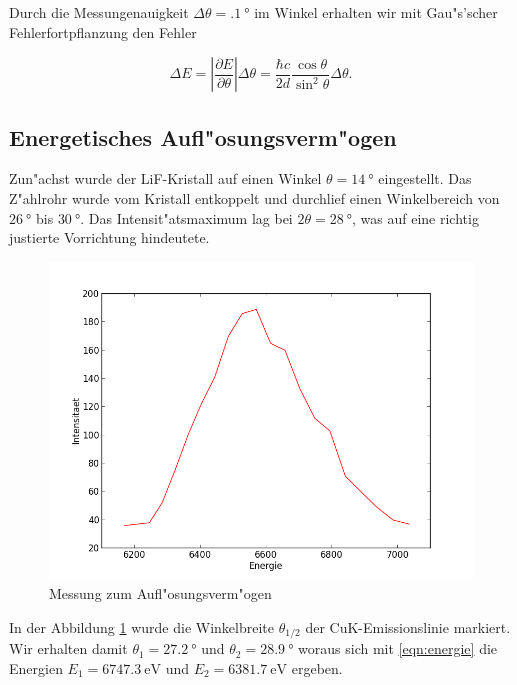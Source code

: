 	Durch die Messungenauigkeit $\Delta \theta = \SI{.1}{\degree}$ im Winkel erhalten wir mit Gau"s'scher Feh\-ler\-fort\-pflanz\-ung den Fehler

	\begin{equation}
		\Delta E = \left| \frac{\partial E}{\partial \theta} \right| \Delta \theta = 
		\frac{\hbar c}{2 d} \frac{\cos{\theta}}{\sin^2{\theta}} \Delta \theta .
	\end{equation}

	\subsection{Energetisches Aufl"osungsverm"ogen}
		\label{subsec:aufloesung}

		Zun"achst wurde der LiF-Kristall auf einen Winkel $\theta = \SI{14}{\degree}$ eingestellt.
		Das Z"ahlrohr wurde vom Kristall entkoppelt und durchlief einen Winkelbereich von $\SI{26}{\degree}$ bis $\SI{30}{\degree}$.
		Das Intensit"atsmaximum lag bei $2\theta = \SI{28}{\degree}$, was auf eine richtig justierte Vorrichtung hin\-deu\-te\-te.

		\begin{figure}[h!]
			\centering
			\includegraphics[width = 15cm]{fits/graph_adjust.png}
			\caption{Messung zum Aufl"osungsverm"ogen}
			\label{fig:aufloesung}
		\end{figure}

		In der Abbildung \ref{fig:aufloesung} wurde die Winkelbreite $\theta_{1/2}$ der CuK-Emissionslinie markiert.
		Wir erhalten damit $\theta_1 = \SI{27.2}{\degree}$ und $\theta_2 = \SI{28.9}{\degree}$ woraus sich mit \eqref{eqn:energie} die Energien $E_1 = \SI{6747.3}{\electronvolt}$ und $E_2 = \SI{6381.7}{\electronvolt}$ ergeben.

